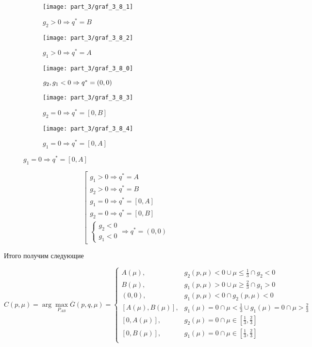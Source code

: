 \begin{figure}[H]
   	\centering
   	\begin{subfigure}[b]{0.3 \textwidth}
       	\centering
       	\texttt{[image: part\_3/graf\_3\_8\_1]}
       	\caption{$g_2 > 0 \Rightarrow q^*=B$}
   	\end{subfigure}
   	\begin{subfigure}[b]{0.3 \textwidth}
       	\centering
       	\texttt{[image: part\_3/graf\_3\_8\_2]}
       	\caption{$g_1 > 0 \Rightarrow q^*=A$}
   	\end{subfigure}
   	\begin{subfigure}[b]{0.3 \textwidth}
       	\centering
       	\texttt{[image: part\_3/graf\_3\_8\_0]}
       	\caption{$\tiny{	
			g_2, g_1 < 0	\Rightarrow q^*=(0,0)
		}$}
   	\end{subfigure}
   	\centering
    \begin{subfigure}[b]{0.3 \textwidth}
       	\centering
       	\texttt{[image: part\_3/graf\_3\_8\_3]}
       	\caption{$g_2 = 0 \Rightarrow q^*=[0,B]$}
    \end{subfigure}
    \begin{subfigure}[b]{0.3 \textwidth}
       	\centering
       	\texttt{[image: part\_3/graf\_3\_8\_4]}
      	\caption{$g_1 = 0 \Rightarrow q^*=[0,A]$}
    \end{subfigure}
\end{figure}

$$
	\left[
	\begin{gathered}
		g_1 > 0 \Rightarrow q^*=A \\
		g_2 > 0 \Rightarrow q^*=B \\			
		g_1 = 0 \Rightarrow q^*=[0,A] \\
		g_2 = 0 \Rightarrow q^*=[0,B] \\			
		\begin{cases}			
			g_2 < 0 \\
			g_1 < 0
		\end{cases}	\Rightarrow q^*=(0,0)
	\end{gathered}
	\right.
$$


Итого получим следующие 

$$
	C(p,\mu) = \arg \max \limits_{P_{AB}} \overline{G}(p,q,\mu) =
	\begin{cases}
		A(\mu), & 
		g_2(p,\mu)<0 \cup \mu \leqslant \frac{1}{3} \cap g_2 < 0 
		\\
		B(\mu), & 
		g_1(p,\mu)>0 \cup \mu \geqslant \frac{2}{3} \cap g_1 > 0 
		\\
		(0,0),  & 
		g_1(p,\mu)<0 \cap g_2(p,\mu)<0 
		\\
		[A(\mu), B(\mu)], &
		g_1(\mu)=0 \cap \mu < \frac{1}{3} \cup
		g_1(\mu)=0 \cap \mu > \frac{2}{3} 
		\\
		[0, A(\mu)], &
		g_2(\mu)=0 \cap \mu \in [\frac{1}{3},\frac{2}{3}] 
		\\
		[0, B(\mu)], & 
		g_1(\mu)=0 \cap \mu \in [\frac{1}{3},\frac{2}{3}] 
		\\
	\end{cases}	
$$	
	
